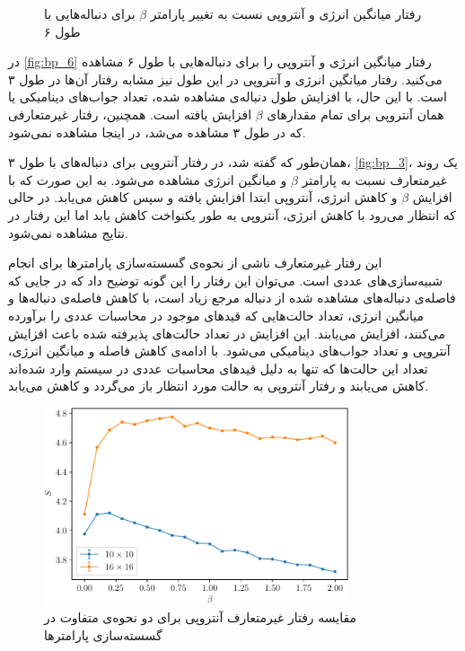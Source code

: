 \begin{figure}
    \caption{
        رفتار میانگین انرژی و آنتروپی نسبت به تغییر پارامتر
        \( \beta \)
        برای دنباله‌هایی با طول ۶
    }
    \label{fig:bp_6}
\end{figure}

در
\autoref{fig:bp_6}
رفتار میانگین انرژی و آنتروپی را برای دنباله‌هایی با طول ۶ مشاهده می‌کنید.
رفتار میانگین انرژی و آنتروپی در این طول نیز مشابه رفتار آن‌ها در طول ۳ است.
با این حال، با افزایش طول دنباله‌ی مشاهده شده، تعداد جواب‌های دینامیکی یا همان آنتروپی برای تمام مقدارهای
\( \beta \)
افزایش یافته است.
همچنین، رفتار غیرمتعارفی که در طول ۳ مشاهده می‌شد، در اینجا مشاهده نمی‌شود.

همان‌طور که گفته شد، در رفتار آنتروپی برای دنباله‌های با طول ۳،
\autoref{fig:bp_3}،
یک روند غیرمتعارف نسبت به پارامتر
\( \beta \)
و میانگین انرژی مشاهده می‌شود.
به این صورت که با افزایش
\( \beta \)
و کاهش انرژی، آنتروپی ابتدا افزایش یافته و سپس کاهش می‌یابد.
در حالی که انتظار می‌رود با کاهش انرژی، آنتروپی به طور یکنواخت کاهش یابد اما این رفتار در نتایج مشاهده نمی‌شود.

این رفتار غیرمتعارف ناشی از نحوه‌ی گسسته‌سازی پارامتر‌ها برای انجام شبیه‌سازی‌های عددی است.
می‌توان این رفتار را این گونه توضیح داد که در جایی که فاصله‌ی دنباله‌های مشاهده شده از دنباله مرجع زیاد است، با کاهش فاصله‌ی دنباله‌ها و میانگین انرژی، تعداد حالت‌هایی که قیدهای موجود در محاسبات عددی را برآورده می‌کنند، افزایش می‌یابند.
این افزایش در تعداد حالت‌های پذیرفته شده باعث افزایش آنتروپی و تعداد جواب‌های دینامیکی می‌شود.
با ادامه‌ی کاهش فاصله و میانگین انرژی، تعداد این حالت‌ها که تنها به دلیل قید‌های محاسبات عددی در سیستم وارد شده‌اند کاهش می‌یابند و رفتار آنتروپی به حالت مورد انتظار باز می‌گردد و کاهش می‌یابد.

\begin{figure}[!ht]
    \centering
    \includegraphics[width=0.8\textwidth]{figures/artifact}
    \caption{مقایسه رفتار غیرمتعارف آنتروپی برای دو نحوه‌ی متفاوت در گسسته‌سازی پارامترها}
    \label{fig:artifact}
\end{figure}

